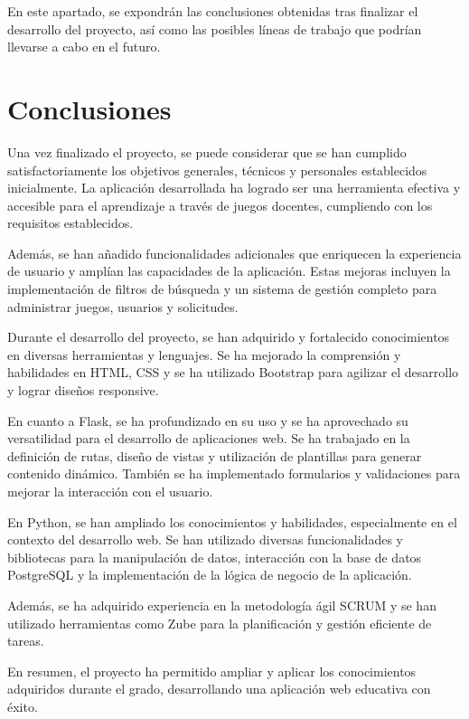 
En este apartado, se expondrán las conclusiones obtenidas tras finalizar el desarrollo del proyecto, así como las posibles líneas de trabajo que podrían llevarse a cabo en el futuro.

\section{Conclusiones}
Una vez finalizado el proyecto, se puede considerar que se han cumplido satisfactoriamente los objetivos generales, técnicos y personales establecidos inicialmente. La aplicación desarrollada ha logrado ser una herramienta efectiva y accesible para el aprendizaje a través de juegos docentes, cumpliendo con los requisitos establecidos.

Además, se han añadido funcionalidades adicionales que enriquecen la experiencia de usuario y amplían las capacidades de la aplicación. Estas mejoras incluyen la implementación de filtros de búsqueda y un sistema de gestión completo para administrar juegos, usuarios y solicitudes.

Durante el desarrollo del proyecto, se han adquirido y fortalecido conocimientos en diversas herramientas y lenguajes. Se ha mejorado la comprensión y habilidades en HTML, CSS y se ha utilizado Bootstrap para agilizar el desarrollo y lograr diseños responsive.

En cuanto a Flask, se ha profundizado en su uso y se ha aprovechado su versatilidad para el desarrollo de aplicaciones web. Se ha trabajado en la definición de rutas, diseño de vistas y utilización de plantillas para generar contenido dinámico. También se ha implementado formularios y validaciones para mejorar la interacción con el usuario.

En Python, se han ampliado los conocimientos y habilidades, especialmente en el contexto del desarrollo web. Se han utilizado diversas funcionalidades y bibliotecas para la manipulación de datos, interacción con la base de datos PostgreSQL y la implementación de la lógica de negocio de la aplicación.

Además, se ha adquirido experiencia en la metodología ágil SCRUM y se han utilizado herramientas como Zube para la planificación y gestión eficiente de tareas. 

En resumen, el proyecto ha permitido ampliar y aplicar los conocimientos adquiridos durante el grado, desarrollando una aplicación web educativa con éxito.

